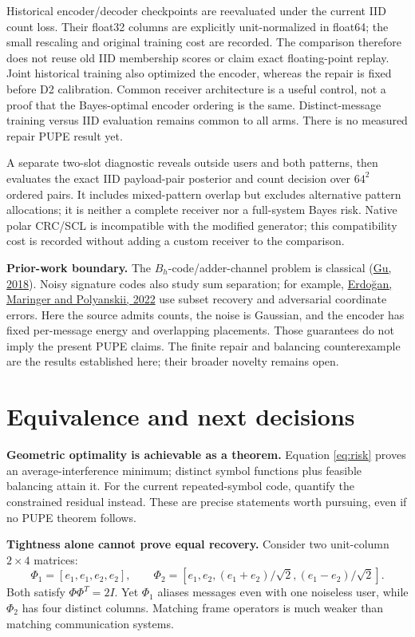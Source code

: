 \documentclass[10pt,a4paper]{article}
\begin{document}
Historical encoder/decoder checkpoints are reevaluated under the current IID count loss. Their
float32 columns are explicitly unit-normalized in float64; the small rescaling and original training
cost are recorded. The comparison therefore does not reuse old IID membership scores or claim exact
floating-point replay. Joint historical training also optimized the encoder, whereas the repair is
fixed before D2 calibration. Common receiver architecture is a useful control, not a proof that the
Bayes-optimal encoder ordering is the same. Distinct-message training versus IID evaluation remains
common to all arms. There is no measured repair PUPE result yet.

A separate two-slot diagnostic reveals outside users and both patterns, then evaluates the exact IID
payload-pair posterior and count decision over $64^2$ ordered pairs. It includes mixed-pattern overlap
but excludes alternative pattern allocations; it is neither a complete receiver nor a full-system
Bayes risk. Native polar CRC/SCL is incompatible with the modified generator; this compatibility cost
is recorded without adding a custom receiver to the comparison.

\textbf{Prior-work boundary.} The $B_h$-code/adder-channel problem is classical
(\href{https://arxiv.org/abs/1809.07364}{Gu, 2018}). Noisy signature codes also study sum separation;
for example, \href{https://arxiv.org/abs/2206.10735}{Erdo\u{g}an, Maringer and Polyanskii, 2022}
use subset recovery and adversarial coordinate errors. Here the source admits counts, the noise is
Gaussian, and the encoder has fixed per-message energy and overlapping placements. Those guarantees
do not imply the present PUPE claims. The finite repair and balancing counterexample are the results
established here; their broader novelty remains open.

\section{Equivalence and next decisions}
\textbf{Geometric optimality is achievable as a theorem.} Equation \eqref{eq:risk} proves an average-interference
minimum; distinct symbol functions plus feasible balancing attain it. For the current repeated-symbol code, quantify
the constrained residual instead. These are precise statements worth pursuing, even if no PUPE theorem follows.

\textbf{Tightness alone cannot prove equal recovery.} Consider two unit-column $2\times4$ matrices:
\begin{equation}
 \Phi_1=[e_1,e_1,e_2,e_2],\qquad
 \Phi_2=[e_1,e_2,(e_1+e_2)/\sqrt2,(e_1-e_2)/\sqrt2].
\end{equation}
Both satisfy $\Phi\Phi^T=2I$. Yet $\Phi_1$ aliases messages even with one noiseless user, while $\Phi_2$ has four
distinct columns. Matching frame operators is much weaker than matching communication systems.
\end{document}
